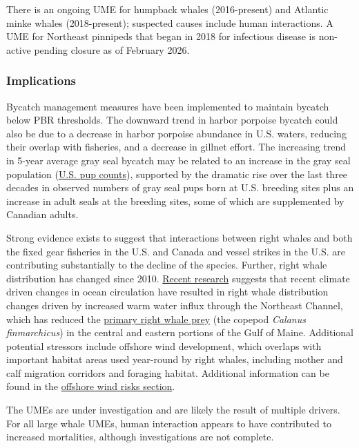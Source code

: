 \documentclass[
  10pt,
]{article}
\begin{document}
There is an ongoing UME for humpback whales (2016-present) and Atlantic minke whales (2018-present); suspected causes include human interactions. A UME for Northeast pinnipeds that began in 2018 for infectious disease is non-active pending closure as of February 2026.

\subsubsection{Implications}\label{implications-4}

Bycatch management measures have been implemented to maintain bycatch below PBR thresholds. The downward trend in harbor porpoise bycatch could also be due to a decrease in harbor porpoise abundance in U.S. waters, reducing their overlap with fisheries, and a decrease in gillnet effort. The increasing trend in 5-year average gray seal bycatch may be related to an increase in the gray seal population (\href{https://noaa-edab.github.io/catalog/seal_pups.html}{U.S. pup counts}), supported by the dramatic rise over the last three decades in observed numbers of gray seal pups born at U.S. breeding sites plus an increase in adult seals at the breeding sites, some of which are supplemented by Canadian adults.

Strong evidence exists to suggest that interactions between right whales and both the fixed gear fisheries in the U.S. and Canada and vessel strikes in the U.S. are contributing substantially to the decline of the species. Further, right whale distribution has changed since 2010. \href{https://noaa-edab.github.io/catalog/narw.html}{Recent research} suggests that recent climate driven changes in ocean circulation have resulted in right whale distribution changes driven by increased warm water influx through the Northeast Channel, which has reduced the \href{https://noaa-edab.github.io/catalog/preyfield_energy.html}{primary right whale prey} (the copepod \emph{Calanus finmarchicus}) in the central and eastern portions of the Gulf of Maine. Additional potential stressors include offshore wind development, which overlaps with important habitat areas used year-round by right whales, including mother and calf migration corridors and foraging habitat. Additional information can be found in the \hyperref[other-ocean-uses-offshore-wind]{offshore wind risks section}.

The UMEs are under investigation and are likely the result of multiple drivers. For all large whale UMEs, human interaction appears to have contributed to increased mortalities, although investigations are not complete.
\end{document}
